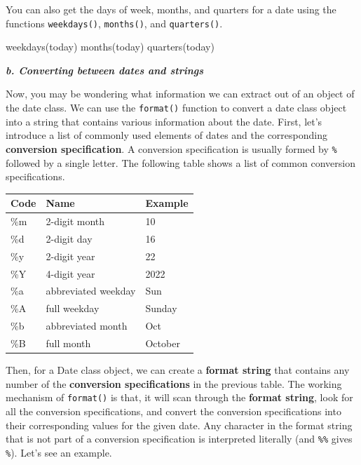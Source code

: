 \documentclass[
]{book}
\newenvironment{Shaded}{\begin{snugshade}}{\end{snugshade}}
\newcommand{\FunctionTok}[1]{\textcolor[rgb]{0.00,0.00,0.00}{#1}}
\newcommand{\NormalTok}[1]{#1}
\begin{document}
You can also get the days of week, months, and quarters for a date using the functions \texttt{weekdays()}, \texttt{months()}, and \texttt{quarters()}.

\begin{Shaded}
\begin{Highlighting}[]
\FunctionTok{weekdays}\NormalTok{(today)}
\FunctionTok{months}\NormalTok{(today)}
\FunctionTok{quarters}\NormalTok{(today)}
\end{Highlighting}
\end{Shaded}

\textbf{\emph{b. Converting between dates and strings}}

Now, you may be wondering what information we can extract out of an object of the date class. We can use the \texttt{format()} function to convert a date class object into a string that contains various information about the date. First, let's introduce a list of commonly used elements of dates and the corresponding \textbf{conversion specification}. A conversion specification is usually formed by \texttt{\%} followed by a single letter. The following table shows a list of common conversion specifications.

\begin{tabular}{l|l|l}
\hline
Code & Name & Example\\
\hline
\%m & 2-digit month & 10\\
\hline
\%d & 2-digit day & 16\\
\hline
\%y & 2-digit year & 22\\
\hline
\%Y & 4-digit year & 2022\\
\hline
\%a & abbreviated weekday & Sun\\
\hline
\%A & full weekday & Sunday\\
\hline
\%b & abbreviated month & Oct\\
\hline
\%B & full month & October\\
\hline
\end{tabular}

Then, for a Date class object, we can create a \textbf{format string} that contains any number of the \textbf{conversion specifications} in the previous table. The working mechanism of \texttt{format()} is that, it will scan through the \textbf{format string}, look for all the conversion specifications, and convert the conversion specifications into their corresponding values for the given date. Any character in the format string that is not part of a conversion specification is interpreted literally (and \texttt{\%\%} gives \texttt{\%}). Let's see an example.
\end{document}
